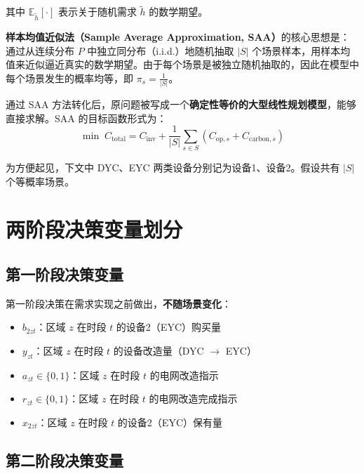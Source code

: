 \documentclass[12pt,a4paper]{article}
\newcommand{\手批注}[2]{\textcolor{#1}{\text{\kaishu #2}}}
\newcommand{\一阶段}{\textcolor{firststage}{\text{\kaishu （一阶段）}}}
\newcommand{\二阶段}{\textcolor{secondstage}{\text{\kaishu （二阶段）}}}
\begin{document}
其中 $\mathbb{E}_{\tilde{h}}[\cdot]$ 表示关于随机需求 $\tilde{h}$ 的数学期望。

\textbf{样本均值近似法（Sample Average Approximation, SAA）}的核心思想是：通过从连续分布 $P$ 中独立同分布（i.i.d.）地随机抽取 $|S|$ 个场景样本，用样本均值来近似逼近真实的数学期望。由于每个场景是被独立随机抽取的，因此在模型中每个场景发生的概率均等，即 $\pi_s = \frac{1}{|S|}$。

通过 SAA 方法转化后，原问题被写成一个\textbf{确定性等价的大型线性规划模型}，能够直接求解。SAA 的目标函数形式为：
\begin{equation}
    \min \; C_{\text{total}} = C_{\text{inv}} + \frac{1}{|S|} \sum_{s \in S} \left( C_{\text{op},s} + C_{\text{carbon},s} \right)
    \label{eq:saa-approximation}
\end{equation}

为方便起见，下文中 DYC、EYC 两类设备分别记为设备1、设备2。假设共有 $|S|$ 个等概率场景。

\section{两阶段决策变量划分}

\subsection{第一阶段决策变量}

第一阶段决策在需求实现之前做出，\textbf{不随场景变化}：

\begin{itemize}[itemsep=0.2em,leftmargin=2em]
    \item $b_{2zt}$：区域 $z$ 在时段 $t$ 的设备2（EYC）购买量
    \item $y_{zt}$：区域 $z$ 在时段 $t$ 的设备改造量（DYC $\to$ EYC）
    \item $a_{zt} \in \{0,1\}$：区域 $z$ 在时段 $t$ 的电网改造指示
    \item $r_{zt} \in \{0,1\}$：区域 $z$ 在时段 $t$ 的电网改造完成指示
    \item $x_{2zt}$：区域 $z$ 在时段 $t$ 的设备2（EYC）保有量
\end{itemize}

\subsection{第二阶段决策变量}
\end{document}
